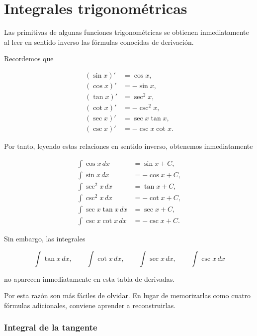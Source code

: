 \documentclass[12pt]{article}
\theoremstyle{definition}
\theoremstyle{remark}
\begin{document}
\section{Integrales trigonométricas}

Las primitivas de algunas funciones trigonométricas se obtienen
inmediatamente al leer en sentido inverso las fórmulas conocidas
de derivación.

Recordemos que

\[
\boxed{
\begin{aligned}
(\sin x)'&=\cos x,\\
(\cos x)'&=-\sin x,\\
(\tan x)'&=\sec^2x,\\
(\cot x)'&=-\csc^2x,\\
(\sec x)'&=\sec x\tan x,\\
(\csc x)'&=-\csc x\cot x.
\end{aligned}}
\]

Por tanto, leyendo estas relaciones en sentido inverso, obtenemos
inmediatamente

\[
\boxed{
\begin{aligned}
\int \cos x\,dx
    &=\sin x+C,\\[1mm]
\int \sin x\,dx
    &=-\cos x+C,\\[1mm]
\int \sec^2x\,dx
    &=\tan x+C,\\[1mm]
\int \csc^2x\,dx
    &=-\cot x+C,\\[1mm]
\int \sec x\tan x\,dx
    &=\sec x+C,\\[1mm]
\int \csc x\cot x\,dx
    &=-\csc x+C.
\end{aligned}}
\]

Sin embargo, las integrales

\[
\int\tan x\,dx,\qquad
\int\cot x\,dx,\qquad
\int\sec x\,dx,\qquad
\int\csc x\,dx
\]

no aparecen inmediatamente en esta tabla de derivadas.

Por esta razón son más fáciles de olvidar. En lugar de
memorizarlas como cuatro fórmulas adicionales, conviene aprender
a reconstruirlas.

\subsubsection*{Integral de la tangente}
\end{document}
